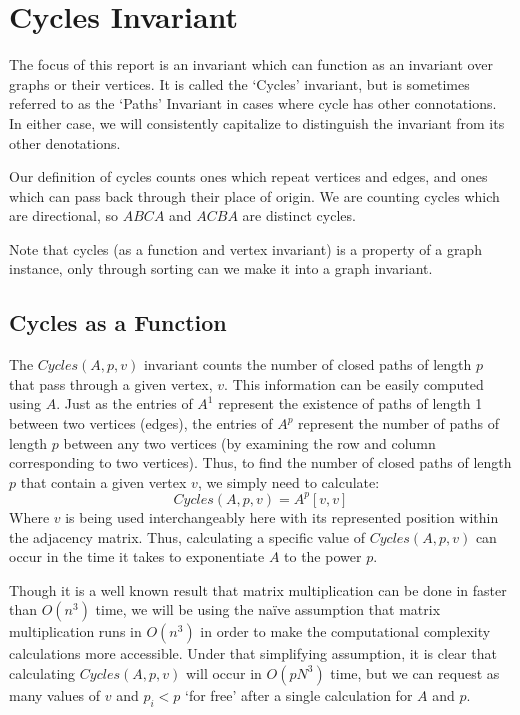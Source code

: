 \section{Cycles Invariant}
The focus of this report is an invariant which can function as an invariant over graphs or their vertices.
It is called the `Cycles' invariant, but is sometimes referred to as the `Paths' Invariant in cases where cycle has other connotations.
In either case, we will consistently capitalize to distinguish the invariant from its other denotations.

Our definition of cycles counts ones which repeat vertices and edges, and ones which can pass back through their place of origin.
We are counting cycles which are directional, so $ABCA$ and $ACBA$ are distinct cycles.

Note that cycles (as a function and vertex invariant) is a property of a graph instance, only through sorting can we make it into a graph invariant.


\subsection{Cycles as a Function}

The $Cycles(A, p, v)$ invariant counts the number of closed paths of length $p$ that pass through a given vertex, $v$. 
This information can be easily computed using $A$. 
Just as the entries of $A^1$ represent the existence of paths of length 1 between two vertices (edges), the entries of $A^p$ represent the number of paths of length $p$ between any two vertices (by examining the row and column corresponding to two vertices).
Thus, to find the number of closed paths of length $p$ that contain a given vertex $v$, we simply need to calculate: 
$$Cycles(A, p, v) = A^p[v, v]$$
Where $v$ is being used interchangeably here with its represented position within the adjacency matrix. 
Thus, calculating a specific value of $Cycles(A, p, v)$ can occur in the time it takes to exponentiate $A$ to the power $p$.

Though it is a well known result that matrix multiplication can be done in faster than $O(n^3)$ time, we will be using the na\"{i}ve assumption that matrix multiplication runs in $O(n^3)$ in order to make the computational complexity calculations more accessible.  
Under that simplifying assumption, it is clear that calculating $Cycles(A, p, v)$ will occur in $O(p N^3)$ time, but we can request as many values of $v$ and $p_i < p$ `for free' after a single calculation for $A$ and $p$.


